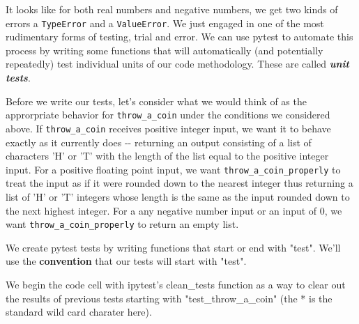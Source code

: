 \documentclass[11pt]{article}
\begin{document}
    It looks like for both real numbers and negative numbers, we get two
kinds of errors a \texttt{TypeError} and a \texttt{ValueError}. We just
engaged in one of the most rudimentary forms of testing, trial and
error. We can use pytest to automate this process by writing some
functions that will automatically (and potentially repeatedly) test
individual units of our code methodology. These are called
\textbf{\emph{unit tests}}.

Before we write our tests, let's consider what we would think of as the
approrpriate behavior for \texttt{throw\_a\_coin} under the conditions
we considered above. If \texttt{throw\_a\_coin} receives positive
integer input, we want it to behave exactly as it currently does -\/-
returning an output consisting of a list of characters 'H' or 'T' with
the length of the list equal to the positive integer input. For a
positive floating point input, we want \texttt{throw\_a\_coin\_properly}
to treat the input as if it were rounded down to the nearest integer
thus returning a list of 'H' or 'T' integers whose length is the same as
the input rounded down to the next highest integer. For a any negative
number input or an input of 0, we want \texttt{throw\_a\_coin\_properly}
to return an empty list.

    We create pytest tests by writing functions that start or end with
"test". We'll use the \textbf{convention} that our tests will start with
"test".

We begin the code cell with ipytest's clean\_tests function as a way to
clear out the results of previous tests starting with
"test\_throw\_a\_coin" (the * is the standard wild card charater here).
\end{document}
